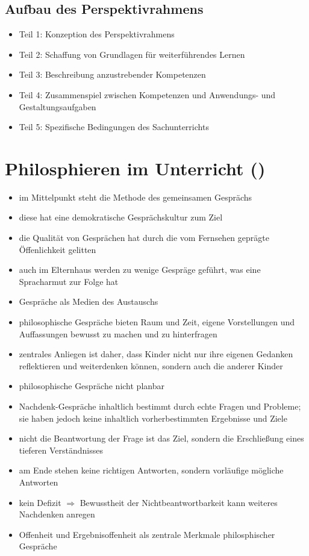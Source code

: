 \subsection{Aufbau des Perspektivrahmens}
\begin{itemize}
	\item{Teil 1: Konzeption des Perspektivrahmens}
	\item{Teil 2: Schaffung von Grundlagen für weiterführendes Lernen}
	\item{Teil 3: Beschreibung anzustrebender Kompetenzen}
	\item{Teil 4: Zusammenspiel zwischen Kompetenzen und Anwendungs- und Gestaltungsaufgaben}
	\item{Teil 5: Spezifische Bedingungen des Sachunterrichts}
\end{itemize}

\newpage
\section{Philosphieren im Unterricht (\cite{KM06})}
\begin{itemize}
	\item{im Mittelpunkt steht die Methode des gemeinsamen Gesprächs}
	\item{diese hat eine demokratische Gesprächskultur zum Ziel}
	\item{die Qualität von Gesprächen hat durch die vom Fernsehen geprägte Öffenlichkeit gelitten}
	\item{auch im Elternhaus werden zu wenige Gespräge geführt, was eine Spracharmut zur Folge hat}
	\item{Gespräche als Medien des Austauschs}
	\item{philosophische Gespräche bieten Raum und Zeit, eigene Vorstellungen und Auffassungen bewusst zu machen und zu hinterfragen}
	\item{zentrales Anliegen ist daher, dass Kinder nicht nur ihre eigenen Gedanken reflektieren und weiterdenken können, sondern auch die anderer Kinder}
	\item{philosophische Gespräche nicht planbar}
	\item{Nachdenk-Gespräche inhaltlich bestimmt durch echte Fragen und Probleme; sie haben jedoch keine inhaltlich vorherbestimmten Ergebnisse und Ziele}
	\item{nicht die Beantwortung der Frage ist das Ziel, sondern die Erschließung eines tieferen Verständnisses}
	\item{am Ende stehen keine richtigen Antworten, sondern vorläufige mögliche Antworten}
	\item{kein Defizit $\Rightarrow$ Bewusstheit der Nichtbeantwortbarkeit kann weiteres Nachdenken anregen}
	\item{Offenheit und Ergebnisoffenheit als zentrale Merkmale philosphischer Gespräche}
\end{itemize}

